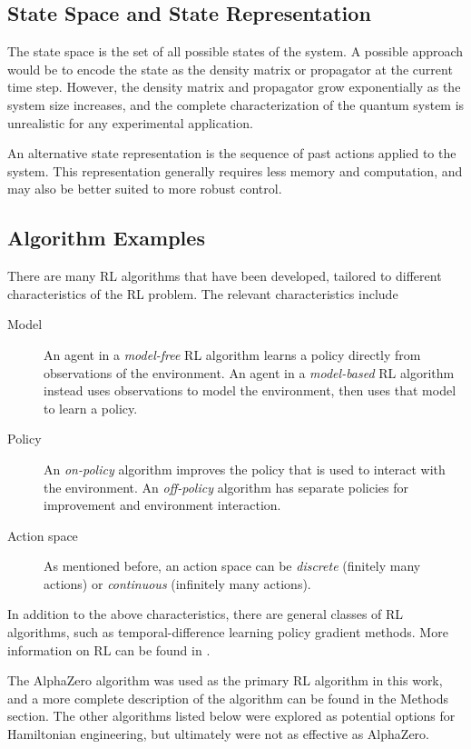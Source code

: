 \subsection{State Space and State Representation}

The state space is the set of all possible states of the system. A possible approach would be to encode the state as the density matrix or propagator at the current time step. However, the density matrix and propagator grow exponentially as the system size increases, and the complete characterization of the quantum system is unrealistic for any experimental application.

An alternative state representation is the sequence of past actions applied to the system.  This representation generally requires less memory and computation, and may also be better suited to more robust control.

\subsection{Algorithm Examples}

There are many RL algorithms that have been developed, tailored to different characteristics of the RL problem. The relevant characteristics include
\begin{description}
    \item[Model] An agent in a \emph{model-free} RL algorithm learns a policy directly from observations of the environment. An agent in a \emph{model-based} RL algorithm instead uses observations to model the environment, then uses that model to learn a policy.
    \item[Policy] An \emph{on-policy} algorithm improves the policy that is used to interact with the environment. An \emph{off-policy} algorithm has separate policies for improvement and environment interaction.
    \item[Action space] As mentioned before, an action space can be \emph{discrete} (finitely many actions) or \emph{continuous} (infinitely many actions).
\end{description}
In addition to the above characteristics, there are general classes of RL algorithms, such as temporal-difference learning policy gradient methods. More information on RL can be found in \cite{sutton2018reinforcement}.


The AlphaZero algorithm was used as the primary RL algorithm in this work, and a more complete description of the algorithm can be found in the Methods section. The other algorithms listed below were explored as potential options for Hamiltonian engineering, but ultimately were not as effective as AlphaZero.

